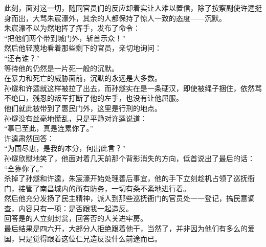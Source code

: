 \begin{multicols}{\theparacolNo}
此刻，面对这一切，随同官员们的反应却着实让人难以置信，除了按察副使许逵挺身而出，大骂朱宸濠外，其余的人都保持了惊人一致的态度——沉默。\\

朱宸濠不以为然地挥了挥手，发布了命令：\\

“把他们两个带到城门外，斩首示众！”\\

然后他轻蔑地看着那些剩下的官员，亲切地询问：\\

“还有谁？”\\

等待他的仍然是一片死一般的沉默。\\

在暴力和死亡的威胁面前，沉默的永远是大多数。\\

孙燧和许逵就这样被拉了出去，而孙燧实在是一条硬汉，即使被绳子捆住，依然骂不绝口，残忍的叛军打断了他的左手，也没有让他屈服。\\

他们就此被带到了惠民门外，这里是行刑的地点。\\

孙燧没有丝毫地慌乱，只是平静对许逵说道：\\

“事已至此，真是连累你了。”\\

许逵肃然回答：\\

“为国尽忠，是我的本分，何出此言？”\\

孙燧欣慰地笑了，他面对着几天前那个背影消失的方向，低首说出了最后的话：\\

“全靠你了。”\\

杀掉了孙燧和许逵，朱宸濠开始处理善后事宜，他的手下立刻趁机占领了巡抚衙门，接管了南昌城内的所有防务，一切有条不紊地进行着。\\

然后他充分发扬了民主精神，派人到那些巡抚衙门的官员处一一登记，搞民意调查，内容只有一项：是否跟我一起造反。\\

回答是的人立刻封赏，回答否的人关进牢房。\\

最后结果是四六开，大部分人拒绝跟着他干，当然了，并非因为他们有多么的爱国，只是觉得跟着这位仁兄造反没什么前途而已。\\


\end{multicols}
